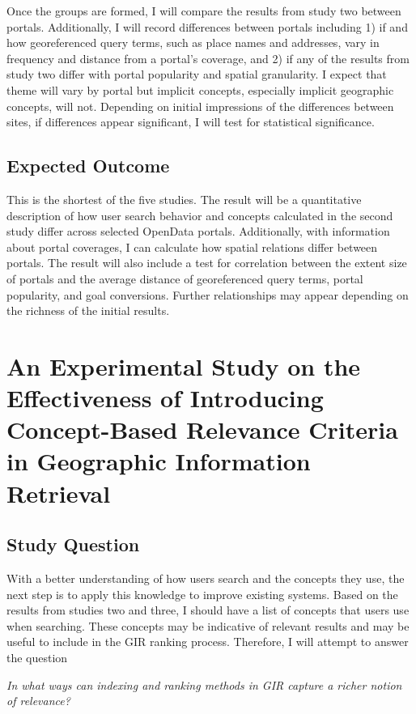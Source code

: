 Once the groups are formed, I will compare the results from study two between portals. Additionally, I will record differences between portals including 1) if and how georeferenced query terms, such as place names and addresses, vary in frequency and distance from a portal's coverage, and 2) if any of the results from study two differ with portal popularity and spatial granularity. I expect that theme will vary by portal but implicit concepts, especially implicit geographic concepts, will not. Depending on initial impressions of the differences between sites, if differences appear significant, I will test for statistical significance.

\subsection{Expected Outcome}
This is the shortest of the five studies. The result will be a quantitative description of how user search behavior and concepts calculated in the second study differ across selected OpenData portals. Additionally, with information about portal coverages, I can calculate how spatial relations differ between portals. The result will also include a test for correlation between the extent size of portals and the average distance of georeferenced query terms, portal popularity, and goal conversions. Further relationships may appear depending on the richness of the initial results.

\section{An Experimental Study on the Effectiveness of Introducing Concept-Based Relevance Criteria in Geographic Information Retrieval}

\subsection{Study Question}
With a better understanding of how users search and the concepts they use, the next step is to apply this knowledge to improve existing systems. Based on the results from studies two and three, I should have a list of concepts that users use when searching. These concepts may be indicative of relevant results and may be useful to include in the GIR ranking process. Therefore, I will attempt to answer the question
\linebreak

\emph{In what ways can indexing and ranking methods in GIR capture a richer notion of relevance?}
\linebreak

